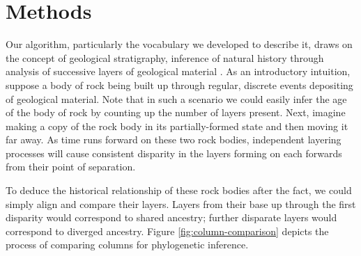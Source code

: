 \section{Methods} \label{sec:methods}



Our algorithm, particularly the vocabulary we developed to describe it, draws on the concept of geological stratigraphy, inference of natural history through analysis of successive layers of geological material \citep{steno1916prodromus}.
As an introductory intuition, suppose a body of rock being built up through regular, discrete events depositing of geological material.
Note that in such a scenario we could easily infer the age of the body of rock by counting up the number of layers present.
Next, imagine making a copy of the rock body in its partially-formed state and then moving it far away.
As time runs forward on these two rock bodies, independent layering processes will cause consistent disparity in the layers forming on each forwards from their point of separation.

To deduce the historical relationship of these rock bodies after the fact, we could simply align and compare their layers.
Layers from their base up through the first disparity would correspond to shared ancestry; further disparate layers would correspond to diverged ancestry.
Figure \ref{fig:column-comparison} depicts the process of comparing columns for phylogenetic inference.


